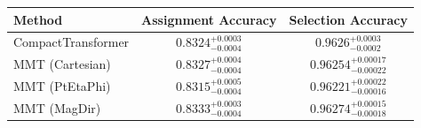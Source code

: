     \begin{tabular}{lcc}
        \toprule
        Method & Assignment Accuracy & Selection Accuracy \\
        \midrule
        CompactTransformer & $0.8324^{+0.0003}_{-0.0004}$ & $0.9626^{+0.0003}_{-0.0002}$ \\
        MMT (Cartesian) & $0.8327^{+0.0004}_{-0.0004}$ & $0.96254^{+0.00017}_{-0.00022}$ \\
        MMT (PtEtaPhi) & $0.8315^{+0.0005}_{-0.0004}$ & $0.96221^{+0.00022}_{-0.00016}$ \\
        MMT (MagDir) & $0.8333^{+0.0003}_{-0.0004}$ & $0.96274^{+0.00015}_{-0.00018}$ \\
        \bottomrule
    \end{tabular}